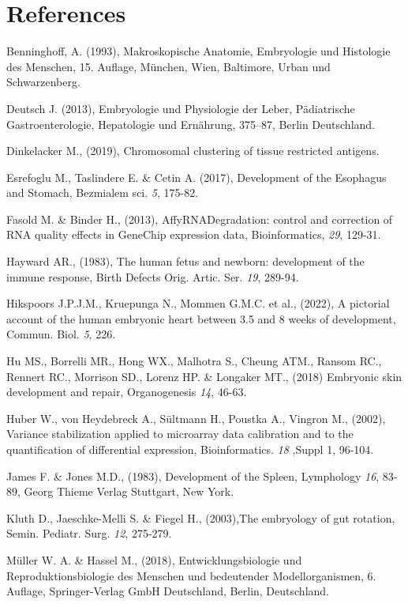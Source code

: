 \documentclass[
]{article}
\begin{document}
\newpage

\hypertarget{references}{%
\section{References}\label{references}}

Benninghoff, A. (1993), Makroskopische Anatomie, Embryologie und Histologie des Menschen, 15. Auflage, München, Wien, Baltimore, Urban und Schwarzenberg.

Deutsch J. (2013), Embryologie und Physiologie der Leber, Pädiatrische Gastroenterologie, Hepatologie und Ernährung, 375--87, Berlin Deutschland.

Dinkelacker M., (2019), Chromosomal clustering of tissue restricted antigens.

Esrefoglu M., Taslindere E. \& Cetin A. (2017), Development of the Esophagus and Stomach, Bezmialem sci. \emph{5}, 175-82.

Fasold M. \& Binder H., (2013), AffyRNADegradation: control and correction of RNA quality effects in GeneChip expression data, Bioinformatics, \emph{29}, 129-31.

Hayward AR., (1983), The human fetus and newborn: development of the immune response, Birth Defects Orig. Artic. Ser. \emph{19}, 289-94.

Hikspoors J.P.J.M., Kruepunga N., Mommen G.M.C. et al., (2022), A pictorial account of the human embryonic heart between 3.5 and 8 weeks of development, Commun. Biol. \emph{5}, 226.

Hu MS., Borrelli MR., Hong WX., Malhotra S., Cheung ATM., Ransom RC., Rennert RC., Morrison SD., Lorenz HP. \& Longaker MT., (2018) Embryonic skin development and repair, Organogenesis \emph{14}, 46-63.

Huber W., von Heydebreck A., Sültmann H., Poustka A., Vingron M., (2002), Variance stabilization applied to microarray data calibration and to the quantification of differential expression, Bioinformatics. \emph{18} ,Suppl 1, 96-104.

James F. \& Jones M.D., (1983), Development of the Spleen, Lymphology \emph{16}, 83-89, Georg Thieme Verlag Stuttgart, New York.

Kluth D., Jaeschke-Melli S. \& Fiegel H., (2003),The embryology of gut rotation, Semin. Pediatr. Surg. \emph{12}, 275-279.

Müller W. A. \& Hassel M., (2018), Entwicklungsbiologie und Reproduktionsbiologie des Menschen und bedeutender Modellorganismen, 6. Auflage, Springer-Verlag GmbH Deutschland, Berlin, Deutschland.
\end{document}
